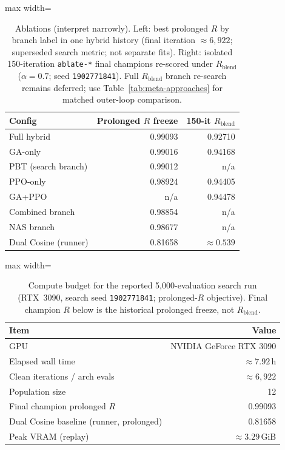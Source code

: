 \begin{table}[htbp]
  \centering
  \caption{Ablations (interpret narrowly).
    Left: best prolonged $R$ by branch label in one hybrid history (final iteration ${\approx}6{,}922$; superseded search metric; not separate fits).
    Right: isolated 150-iteration \texttt{ablate-*} final champions re-scored under $R_{\mathrm{blend}}$ ($\alpha{=}0.7$; seed \texttt{1902771841}).
    Full $R_{\mathrm{blend}}$ branch re-search remains deferred; use Table~\ref{tab:meta-approaches} for matched outer-loop comparison.}
  \label{tab:ablation}
  \setlength{\tabcolsep}{3pt}
  \begin{adjustbox}{max width=\columnwidth}
  \begin{tabular}{@{}lrr@{}}
    \toprule
    Config & Prolonged $R$ freeze & 150-it $R_{\mathrm{blend}}$ \\
    \midrule
    Full hybrid & 0.99093 & 0.92710 \\
    GA-only & 0.99016 & 0.94168 \\
    PBT (search branch) & 0.99012 & n/a \\
    PPO-only & 0.98924 & 0.94405 \\
    GA+PPO & n/a & 0.94478 \\
    Combined branch & 0.98854 & n/a \\
    NAS branch & 0.98677 & n/a \\
    Dual Cosine (runner) & 0.81658 & ${\approx}0.539$ \\
    \bottomrule
  \end{tabular}
\end{adjustbox}
\end{table}
\FloatBarrier

\begin{table}[htbp]
  \centering
  \caption{Compute budget for the reported 5,000-evaluation search run (RTX~3090, search seed \texttt{1902771841}; prolonged-$R$ objective).
    Final champion $R$ below is the historical prolonged freeze, not $R_{\mathrm{blend}}$.}
  \label{tab:compute}
  \setlength{\tabcolsep}{3pt}
  \begin{adjustbox}{max width=\columnwidth}
\begin{tabular}{@{}lr@{}}
    \toprule
    Item & Value \\
    \midrule
    GPU & NVIDIA GeForce RTX 3090 \\
    Elapsed wall time & ${\approx}7.92$\,h \\
    Clean iterations / arch evals & ${\approx}6{,}922$ \\
    Population size & 12 \\
    Final champion prolonged $R$ & 0.99093 \\
    Dual Cosine baseline (runner, prolonged) & 0.81658 \\
    Peak VRAM (replay) & ${\approx}3.29$\,GiB \\
    \bottomrule
  \end{tabular}
\end{adjustbox}
\end{table}
\FloatBarrier

